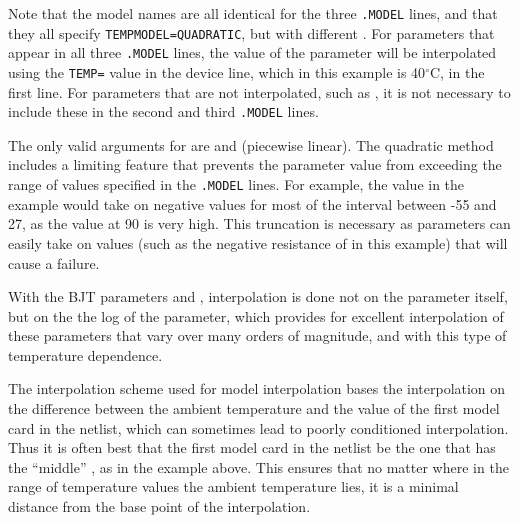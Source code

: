 Note that the model names are all identical for the three \texttt{.MODEL}
lines, and that they all specify \texttt{TEMPMODEL=QUADRATIC}, but with
different .  For parameters that appear in all three
\texttt{.MODEL} lines, the value of the parameter will be interpolated using
the \texttt{TEMP=} value in the device line, which in this example is
40$^\circ$C, in the first line.  For parameters that are not interpolated, such
as , it is not necessary to include these in the second and third
\texttt{.MODEL} lines.

The only valid arguments for  are  and
 (piecewise linear).  The quadratic method includes a limiting
feature that prevents the parameter value from exceeding the range of values
specified in the \texttt{.MODEL} lines.  For example, the  value in
the example would take on negative values for most of the interval between -55
and 27, as the value at 90 is very high.  This truncation is necessary as
parameters can easily take on values (such as the negative resistance of
 in this example) that will cause a \Xyce{} failure.

With the BJT parameters  and , interpolation is done
not on the parameter itself, but on the the log of the parameter, which
provides for excellent interpolation of these parameters that vary over many
orders of magnitude, and with this type of temperature dependence.

The interpolation scheme used for model interpolation bases the interpolation
on the difference between the ambient temperature and the  value
of the first model card in the netlist, which can sometimes lead to poorly
conditioned interpolation.  Thus it is often best that the first model card in
the netlist be the one that has the ``middle'' , as in the
example above.  This ensures that no matter where in the range of temperature
values the ambient temperature lies, it is a minimal distance from the base
point of the interpolation.
